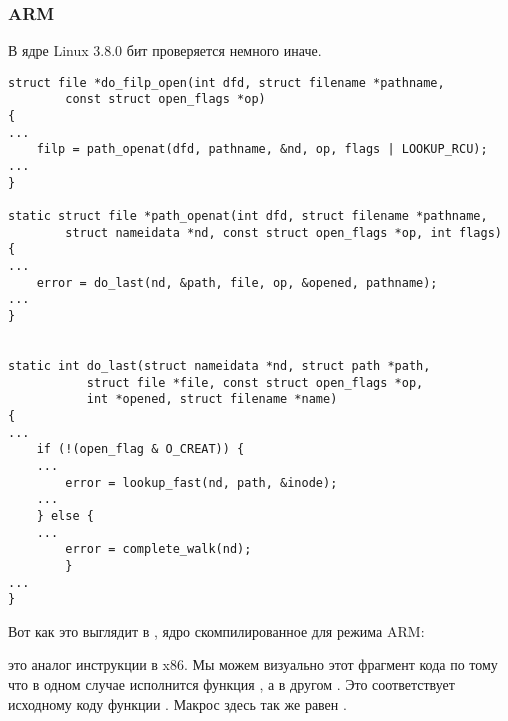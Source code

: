 \subsubsection{ARM}

В ядре Linux 3.8.0 бит  проверяется немного иначе.

\begin{lstlisting}[caption=linux kernel 3.8.0,style=customc]
struct file *do_filp_open(int dfd, struct filename *pathname,
		const struct open_flags *op)
{
...
	filp = path_openat(dfd, pathname, &nd, op, flags | LOOKUP_RCU);
...
}

static struct file *path_openat(int dfd, struct filename *pathname,
		struct nameidata *nd, const struct open_flags *op, int flags)
{
...
	error = do_last(nd, &path, file, op, &opened, pathname);
...
}


static int do_last(struct nameidata *nd, struct path *path,
		   struct file *file, const struct open_flags *op,
		   int *opened, struct filename *name)
{
...
	if (!(open_flag & O_CREAT)) {
    ...
		error = lookup_fast(nd, path, &inode);
    ...
	} else {
    ...
		error = complete_walk(nd);
        }
...
}
\end{lstlisting}

Вот как это выглядит в \IDA, ядро скомпилированное для режима ARM:



 это аналог инструкции \TEST в x86.
Мы можем  визуально этот фрагмент кода по тому что в одном случае исполнится 
функция , а в другом .
Это соответствует исходному коду функции .
Макрос  здесь так же равен .

